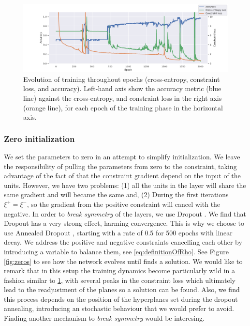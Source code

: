 \begin{figure}[h]
  \begin{center}
    \includegraphics[width=1.0\textwidth]{peaks}
      \caption{Evolution of training throughout epochs (cross-entropy, constraint loss, and accuracy). Left-hand axis show the accuracy metric (blue line) against the cross-entropy, and constraint loss in the right axis (orange line), for each epoch of the training phase in the horizontal axis.}
			\label{fig:peaks}
\end{center}
\end{figure}





\subsubsection{Zero initialization}\label{subsec:zero}

We set the parameters to zero in an attempt to simplify initialization. We leave the responsibility of pulling the parameters from zero to the constraint, taking advantage of the fact of that the constraint gradient depend on the input of the units. However, we have two problems: (1) all the units in the layer will share the same gradient and will became the same and, (2) During the first iterations $\xi^+ = \xi^-$, so the gradient from the positive constraint will cancel with the negative.
In order to \emph{break symmetry} of the layers, we use Dropout \cite{dropout}. We find that Dropout has a very strong effect, harming convergence. This is why we choose to use Annealed Dropout \cite{dropoutAnnealing}, starting with a rate of 0.5 for 500 epochs with linear decay. We address the positive and negative constraints cancelling each other by introducing a variable to balance them, see \ref{eq:definitionOfRho}. 
See Figure \ref{fig:zeros} to see how the network evolves until finds a solution. We would like to remark that in this setup the training dynamics become particularly wild in a fashion similar to \ref{fig:peaks}, with several peaks in the constraint loss which ultimately lead to the readjustment of the planes so a solution can be found. Also, we find this process depends on the position of the hyperplanes set during the dropout annealing, introducing an stochastic behaviour that we would prefer to avoid. Finding another mechanism to \emph{break symmetry} would be interesing.



